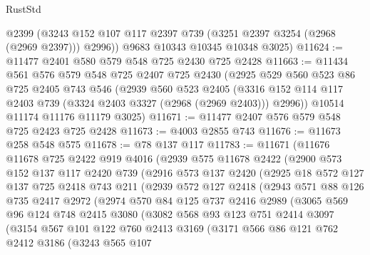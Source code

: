 \begin{lexlean}{RustStd}
\begin{coremodule}
        @2399
        (@3243 @152 @107 @117 @2397 @739 (@3251 @2397 @3254 (@2968 (@2969 @2397))) @2996))
      @9683
      @10343
      @10345
      @10348
      @3025)
@11624 := @11477 @2401 @580 @579 @548 @725 @2430 @725 @2428
@11663 := @11434
    @561
    @576
    @579
    @548
    @725
    @2407
    @725
    @2430
    (@2925
      @529
      @560
      @523
      @86
      @725
      @2405
      @743
      @546
      (@2939
        @560
        @523
        @2405
        (@3316 @152 @114 @117 @2403 @739 (@3324 @2403 @3327 (@2968 (@2969 @2403))) @2996))
      @10514
      @11174
      @11176
      @11179
      @3025)
@11671 := @11477 @2407 @576 @579 @548 @725 @2423 @725 @2428
@11673 := @4003 @2855 @743
@11676 := @11673 @258 @548 @575
@11678 := @78 @137 @117
@11783 := @11671
    (@11676
      @11678
      @725
      @2422
      @919
      @4016
      (@2939
        @575
        @11678
        @2422
        (@2900
          @573
          @152
          @137
          @117
          @2420
          @739
          (@2916
            @573
            @137
            @2420
            (@2925
              @18
              @572
              @127
              @137
              @725
              @2418
              @743
              @211
              (@2939
                @572
                @127
                @2418
                (@2943
                  @571
                  @88
                  @126
                  @735
                  @2417
                  @2972
                  (@2974
                    @570
                    @84
                    @125
                    @737
                    @2416
                    @2989
                    (@3065
                      @569
                      @96
                      @124
                      @748
                      @2415
                      @3080
                      (@3082
                        @568
                        @93
                        @123
                        @751
                        @2414
                        @3097
                        (@3154
                          @567
                          @101
                          @122
                          @760
                          @2413
                          @3169
                          (@3171
                            @566
                            @86
                            @121
                            @762
                            @2412
                            @3186
                            (@3243
                              @565
                              @107

\end{coremodule}
\end{lexlean}
